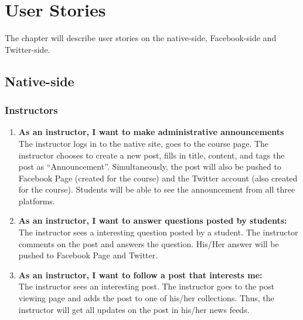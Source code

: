 
%
%

\chapter{User Stories}
The chapter will describe user stories on the native-side, Facebook-side and Twitter-side. 

\section{Native-side}
\subsection{Instructors}
\begin{enumerate}
	\item \textbf{As an instructor, I want to make administrative announcements} \\
	The instructor logs in to the native site, goes to the course page. The instructor chooses to create a new post, fills in title, content, and tags the post as ``Announcement''. Simultaneously, the post will also be pushed to Facebook Page (created for the course) and the Twitter account (also created for the course). Students will be able to see the announcement from all three platforms.  
	
	\item \textbf{As an instructor, I want to answer questions posted by students:} \\
	The instructor sees a interesting question posted by a student. The instructor comments on the post and answers the question. His/Her answer will be pushed to Facebook Page and Twitter.
	 
	\item \textbf{As an instructor, I want to follow a post that interests me:} \\
	The instructor sees an interesting post. The instructor goes to the post viewing page and adds the post to one of his/her collections. Thus, the instructor will get all updates on the post in his/her news feeds.
\end{enumerate}

